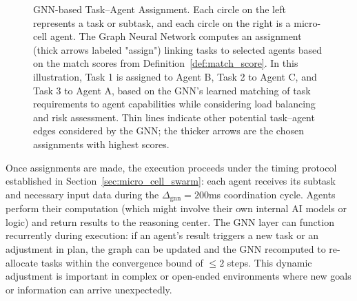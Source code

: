 \documentclass{article}
\begin{document}
\begin{figure}[H]
\centering
{}
\caption{GNN-based Task–Agent Assignment. Each circle on the left represents a task or subtask, and each circle on the right is a micro-cell agent. The Graph Neural Network computes an assignment (thick arrows labeled "assign") linking tasks to selected agents based on the match scores from Definition~\ref{def:match_score}. In this illustration, Task 1 is assigned to Agent B, Task 2 to Agent C, and Task 3 to Agent A, based on the GNN's learned matching of task requirements to agent capabilities while considering load balancing and risk assessment. Thin lines indicate other potential task–agent edges considered by the GNN; the thicker arrows are the chosen assignments with highest scores.}
\label{fig:task_assignment}
\end{figure}

Once assignments are made, the execution proceeds under the timing protocol established in Section~\ref{sec:micro_cell_swarm}: each agent receives its subtask and necessary input data during the $\Delta_{\text{gnn}} = 200$ms coordination cycle. Agents perform their computation (which might involve their own internal AI models or logic) and return results to the reasoning center. The GNN layer can function recurrently during execution: if an agent's result triggers a new task or an adjustment in plan, the graph can be updated and the GNN recomputed to re-allocate tasks within the convergence bound of $\leq 2$ steps. This dynamic adjustment is important in complex or open-ended environments where new goals or information can arrive unexpectedly.
\end{document}
